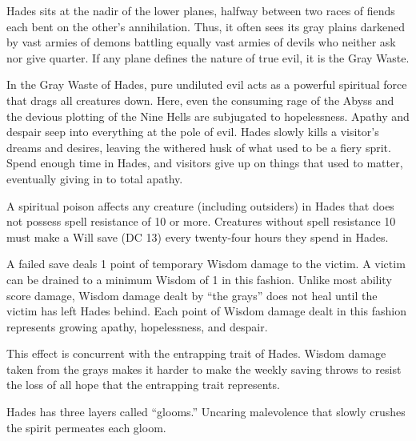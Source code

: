 Hades sits at the nadir of the lower planes, halfway
between two races of fiends each bent on the other's annihilation. Thus, it often sees its gray plains darkened by vast armies of demons battling equally vast armies of devils who neither ask nor give quarter. If any plane defines the nature of true evil, it is the Gray Waste.

In the Gray Waste of Hades, pure undiluted evil acts as a powerful spiritual force that drags all creatures down. Here, even the consuming rage of the Abyss and the devious plotting of the Nine Hells are subjugated to hopelessness. Apathy and despair seep into everything at the pole of evil. Hades slowly kills a visitor's dreams and desires, leaving the withered husk of what used to be a fiery sprit. Spend enough time in Hades, and visitors give up on things that used to matter, eventually giving in to total apathy.

A spiritual poison affects any creature (including outsiders) in Hades that does not possess spell resistance of 10 or more. Creatures without spell resistance 10 must make a Will save (DC 13) every twenty-four hours they spend in Hades.

A failed save deals 1 point of temporary Wisdom damage to the victim. A victim can be drained to a minimum Wisdom of 1 in this fashion. Unlike most ability score damage, Wisdom damage dealt by ``the grays'' does not heal until the victim has left Hades behind. Each point of Wisdom damage dealt in this fashion represents growing apathy, hopelessness, and despair.

This effect is concurrent with the entrapping trait of Hades. Wisdom damage taken from the grays makes it harder to make the weekly saving throws to resist the loss of all hope that the entrapping trait represents.

Hades has three layers called ``glooms.'' Uncaring malevolence that slowly crushes the spirit permeates each gloom.

